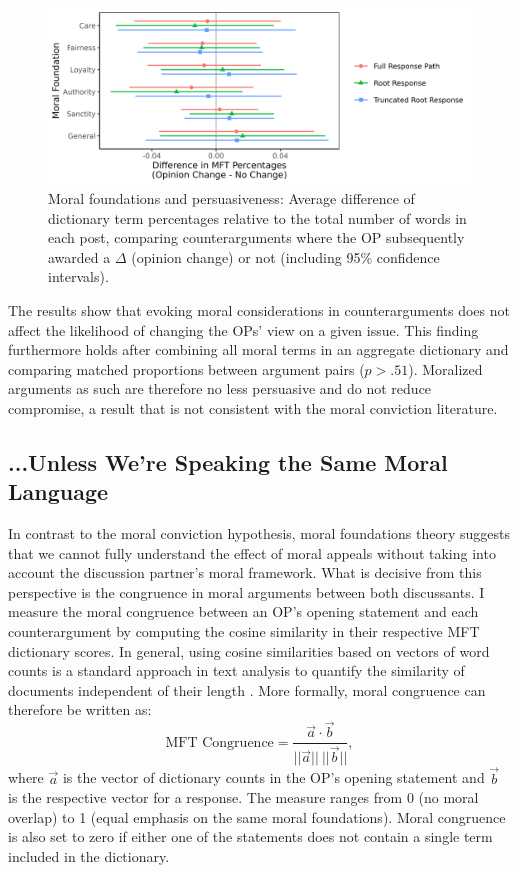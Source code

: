 \begin{figure}[ht]
\centering
\includegraphics{fig6-persuasiveness_political.png}
\caption[Moral foundations and persuasiveness]{Moral foundations and persuasiveness: Average difference of dictionary term percentages relative to the total number of words in each post, comparing counterarguments where the OP subsequently awarded a $\Delta$ (opinion change) or not (including 95\% confidence intervals).}\label{fig:persuasiveness}
\end{figure}

The results show that evoking moral considerations in counterarguments does not affect the likelihood of changing the OPs' view on a given issue. This finding furthermore holds after combining all moral terms in an aggregate dictionary and comparing matched proportions between argument pairs ($p > .51$). Moralized arguments as such are therefore no less persuasive and do not reduce compromise, a result that is not consistent with the moral conviction literature.



\subsection{...Unless We're Speaking the Same Moral Language}

In contrast to the moral conviction hypothesis, moral foundations theory suggests that we cannot fully understand the effect of moral appeals without taking into account the discussion partner's moral framework.  What is decisive from this perspective is the congruence in moral arguments between both discussants. I measure the moral congruence between an OP's opening statement and each counterargument by computing the cosine similarity in their respective MFT dictionary scores. In general, using cosine similarities based on vectors of word counts is a standard approach in text analysis to quantify the similarity of documents independent of their length \citep[e.g.,][]{manning2008introduction}. More formally, moral congruence can therefore be written as:
\begin{equation}
\text{MFT Congruence}=\dfrac{\vec{a}\cdot \vec{b}}{||\vec{a}||\ ||\vec{b}||},
\end{equation}
where $\vec{a}$ is the vector of dictionary counts in the OP's opening statement and $\vec{b}$ is the respective vector for a response. The measure ranges from 0 (no moral overlap) to 1 (equal emphasis on the same moral foundations). Moral congruence is also set to zero if either one of the statements does not contain a single term included in the dictionary.

